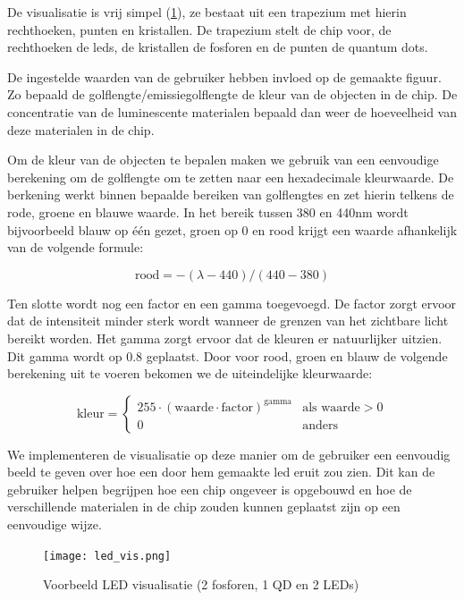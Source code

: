 De visualisatie is vrij simpel (\cref{fig:led_vis}), ze bestaat uit een trapezium met hierin rechthoeken, punten en kristallen. De trapezium stelt de chip voor, de rechthoeken de \gls{led}s, de kristallen de fosforen en de punten de quantum dots.

De ingestelde waarden van de gebruiker hebben invloed op de gemaakte figuur. Zo bepaald de golflengte/emissiegolflengte de kleur van de objecten in de chip. De concentratie van de luminescente materialen bepaald dan weer de hoeveelheid van deze materialen in de chip.

Om de kleur van de objecten te bepalen maken we gebruik van een eenvoudige berekening om de golflengte om te zetten naar een hexadecimale kleurwaarde. De berkening werkt binnen bepaalde bereiken van golflengtes en zet hierin telkens de rode, groene en blauwe waarde. In het bereik tussen 380 en 440nm wordt bijvoorbeeld blauw op \'e\'en gezet, groen op 0 en rood krijgt een waarde afhankelijk van de volgende formule:

\begin{equation}
    \text{rood} = -(\lambda - 440) / (440 - 380)
\end{equation}

Ten slotte wordt nog een factor en een gamma toegevoegd. De factor zorgt ervoor dat de intensiteit minder sterk wordt wanneer de grenzen van het zichtbare licht bereikt worden. Het gamma zorgt ervoor dat de kleuren er natuurlijker uitzien. Dit gamma wordt op 0.8 geplaatst. Door voor rood, groen en blauw de volgende berekening uit te voeren bekomen we de uiteindelijke kleurwaarde:

\begin{equation}
    \text{kleur} = \begin{cases}
        255 \cdot (\text{waarde}\cdot\text{factor})^{\text{gamma}} & \text{als waarde} > 0 \\
        0 & \text{anders}
    \end{cases}
\end{equation}

We implementeren de visualisatie op deze manier om de gebruiker een eenvoudig beeld te geven over hoe een door hem gemaakte \gls{led} eruit zou zien. Dit kan de gebruiker helpen begrijpen hoe een chip ongeveer is opgebouwd en hoe de verschillende materialen in de chip zouden kunnen geplaatst zijn op een eenvoudige wijze.

\begin{figure}[H]
    \centering
    \texttt{[image: led\_vis.png]}
    \caption{Voorbeeld LED visualisatie (2 fosforen, 1 QD en 2 LEDs)}%
    \label{fig:led_vis}
\end{figure}

